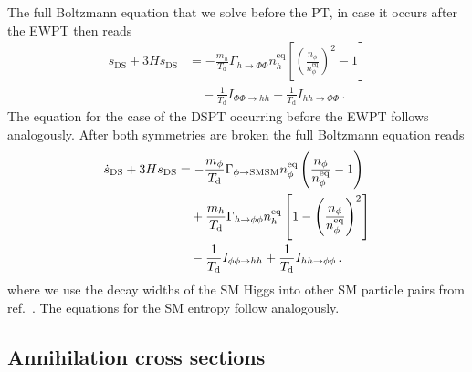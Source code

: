 The full Boltzmann equation that we solve before the \ac{PT}, in case  it occurs after the \ac{EWPT} then reads
\begin{align}
	\dot{s}_{\mathrm{DS}} + 3H s_{\mathrm{DS}} &= - \frac{m_h}{T_{\mathrm{d}}}\Gamma_{h\rightarrow\Phi\Phi} n_{h}^{\mathrm{eq}}
	\left[\left(\frac{n_{\phi}}{n_{\phi}^{\mathrm{eq}}}  \right)^2 - 1  \right] \nonumber \\ & \quad 
	- \frac{1}{T_{\mathrm{d}}} I_{\Phi\Phi\to hh}
	+ \frac{1}{T_{\mathrm{d}}}I_{hh\to \Phi\Phi} \,. 
\end{align}
The equation for the case of the \ac{DSPT} occurring before the \ac{EWPT} follows analogously.  After both symmetries are broken the full Boltzmann equation reads 
\begin{align}
	\dot{s}_{\mathrm{DS}} + 3H s_{\mathrm{DS}}
	&= - \frac{m_\phi}{T_\mathrm{d}}\Gamma_{\phi \to \mathrm{SM}\mathrm{SM}} n^\text{eq}_\phi
	\left( \frac{n_\phi}{n^\text{eq}_\phi} - 1 \right) \nonumber \\ & \quad 
	+ \frac{m_{h}}{T_\mathrm{d}}\Gamma_{h \to \phi \phi} n^\text{eq}_h
	\left[ 1 - \left(\frac{n_\phi}{n^\text{eq}_\phi}\right)^2 \right] \notag\\
	& \quad - \frac{1}{T_{\mathrm{d}}} I_{\phi\phi\to hh} + \frac{1}{T_{\mathrm{d}}}I_{hh\to \phi\phi} \,.
\end{align}
where we use the decay widths of the \ac{SM} Higgs into other \ac{SM} particle pairs from ref.~\cite{Ferber:2023iso}. The equations for the \ac{SM} entropy follow analogously.

\subsection{Annihilation cross sections}
\label{app:annihilation}

